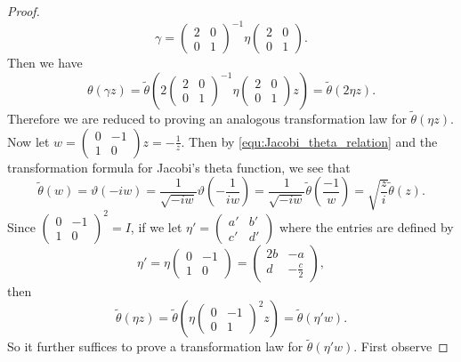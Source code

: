 \documentclass[12pt]{book}
\theoremstyle{definition}\newframedtheorem{method}{Method}
\newcommand{\g}{\gamma}
\renewcommand{\t}{\theta}
\newcommand{\vt}{\vartheta}
\newcommand{\<}{\langle}
\renewcommand{\>}{\rangle}
\newcommand{\wtilde}{\widetilde}
\begin{document}
\begin{proof}
      \[
        \g = \begin{pmatrix} 2 & 0 \\ 0 & 1 \end{pmatrix}^{-1} \eta \begin{pmatrix} 2 & 0 \\ 0 & 1 \end{pmatrix}.
      \]
      Then we have
      \[
        \t(\g z) = \wtilde{\t}\left(2\begin{pmatrix} 2 & 0 \\ 0 & 1 \end{pmatrix}^{-1} \eta \begin{pmatrix} 2 & 0 \\ 0 & 1 \end{pmatrix}z\right) = \wtilde{\t}(2\eta z).
      \]
      Therefore we are reduced to proving an analogous transformation law for $\wtilde{\t}(\eta z)$. Now let $w = \begin{pmatrix} 0 & -1 \\ 1 & 0 \end{pmatrix}z = -\frac{1}{z}$. Then by \cref{equ:Jacobi_theta_relation} and the transformation formula for Jacobi's theta function, we see that
      \[
        \wtilde{\t}(w) = \vt(-iw) = \frac{1}{\sqrt{-iw}}\vt\left(-\frac{1}{iw}\right) = \frac{1}{\sqrt{-iw}}\wtilde{\t}\left(\frac{-1}{w}\right) = \sqrt{\frac{z}{i}}\wtilde{\t}(z).
      \]
      Since $\begin{pmatrix} 0 & -1 \\ 1 & 0 \end{pmatrix}^{2} = I$, if we let $\eta' = \begin{pmatrix} a' & b' \\ c' & d' \end{pmatrix}$ where the entries are defined by
      \[
        \eta' = \eta\begin{pmatrix} 0 & -1 \\ 1 & 0 \end{pmatrix} = \begin{pmatrix} 2b & -a \\ d & -\frac{c}{2} \end{pmatrix},
      \]
      then
      \[
        \wtilde{\t}(\eta z) = \wtilde{\t}\left(\eta \begin{pmatrix} 0 & -1 \\ 0 & 1 \end{pmatrix}^{2} z\right) = \wtilde{\t}(\eta'w).
      \]
      So it further suffices to prove a transformation law for $\wtilde{\t}(\eta'w)$. First observe

\end{proof}
\end{document}
